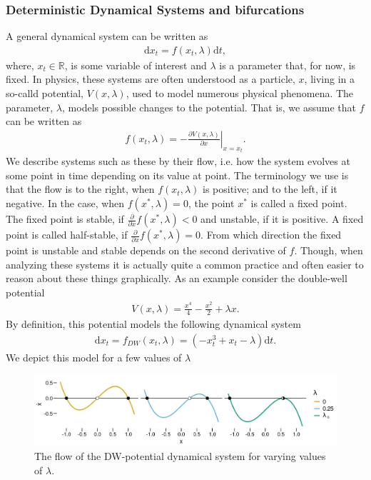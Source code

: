 \subsubsection{Deterministic Dynamical Systems and bifurcations}
A general dynamical system can be written as
\begin{align}
    \mathrm{d}x_t = f(x_t, \lambda)\mathrm{d}t, \label{eq:generalDynamicalSystem}
\end{align}
where, $x_t\in\mathbb{R}$, is some variable of interest and $\lambda$ is a parameter that, for now, is fixed. In physics, these systems are often understood as a particle, $x$, living in a so-calld potential, $V(x,\lambda)$, used to model numerous physical phenomena. The parameter, $\lambda$, models possible changes to the potential. That is, we assume that $f$ can be written as
\begin{align}
     f(x_t, \lambda) = \left.-\frac{\partial V(x,\lambda)}{\partial x}\right|_{x=x_t}.
\end{align}
We describe systems such as these by their flow, i.e. how the system evolves at some point in time depending on its value at point. The terminology we use is that the flow is to the right, when $f(x_t, \lambda)$ is positive; and to the left, if it negative. In the case, when $f(x^*, \lambda) = 0$, the point $x^*$ is called a fixed point. The fixed point is stable, if $\frac{\partial}{\partial x}f(x^*, \lambda) < 0$ and unstable, if it is positive. A fixed point is called half-stable, if $\frac{\partial}{\partial x}f(x^*, \lambda) = 0$. From which direction the fixed point is unstable and stable depends on the second derivative of $f$. Though, when analyzing these systems it is actually quite a common practice and often easier to reason about these things graphically.
As an example consider the double-well potential
\begin{align}
    V(x,\lambda) = \frac{x^4}{4} - \frac{x^2}{2} + \lambda x\label{eq:doubleWellPotential}.
\end{align}
By definition, this potential models the following dynamical system
\begin{align}
    \mathrm{d}x_t = f_{DW}(x_t, \lambda) = \left(-x_t^3 + x_t - \lambda \right) \mathrm{d}t \label{eq:originalDW}.
\end{align}
We depict this model for a few values of $\lambda$
\begin{figure}[h]
    \begin{center}
        \includegraphics[scale = .5]{figures/double_well_plot.jpeg}
        \caption{The flow of the DW-potential dynamical system for varying values of $\lambda$.}
        \label{figure:DW_dynamic_plot}
    \end{center}
\end{figure}\\
